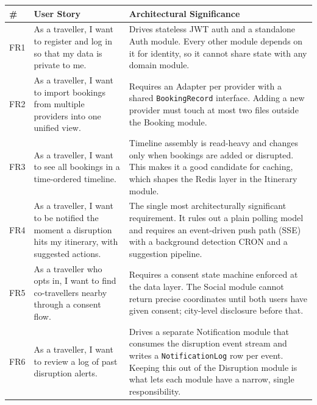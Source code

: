 \documentclass[12pt,a4paper]{article}
\begin{document}
\begin{longtable}{@{}L{0.5cm}L{5.2cm}L{6.8cm}@{}}
\toprule
\textbf{\#} & \textbf{User Story} & \textbf{Architectural Significance} \\
\midrule
\endhead

FR1 &
  As a traveller, I want to register and log in so that my data is private to me. &
  Drives stateless JWT auth and a standalone Auth module. Every other module depends on it for
  identity, so it cannot share state with any domain module. \\[0.4em]

FR2 &
  As a traveller, I want to import bookings from multiple providers into one unified view. &
  Requires an Adapter per provider with a shared \texttt{BookingRecord} interface. Adding a
  new provider must touch at most two files outside the Booking module. \\[0.4em]

FR3 &
  As a traveller, I want to see all bookings in a time-ordered timeline. &
  Timeline assembly is read-heavy and changes only when bookings are added or disrupted. This
  makes it a good candidate for caching, which shapes the Redis layer in the Itinerary
  module. \\[0.4em]

FR4 &
  As a traveller, I want to be notified the moment a disruption hits my itinerary, with
  suggested actions. &
  The single most architecturally significant requirement. It rules out a plain polling model
  and requires an event-driven push path (SSE) with a background detection CRON and a
  suggestion pipeline. \\[0.4em]

FR5 &
  As a traveller who opts in, I want to find co-travellers nearby through a consent flow. &
  Requires a consent state machine enforced at the data layer. The Social module cannot return
  precise coordinates until both users have given consent; city-level disclosure before that. \\[0.4em]

FR6 &
  As a traveller, I want to review a log of past disruption alerts. &
  Drives a separate Notification module that consumes the disruption event stream and writes
  a \texttt{NotificationLog} row per event. Keeping this out of the Disruption module is what
  lets each module have a narrow, single responsibility. \\

\bottomrule
\end{longtable}
\end{document}
